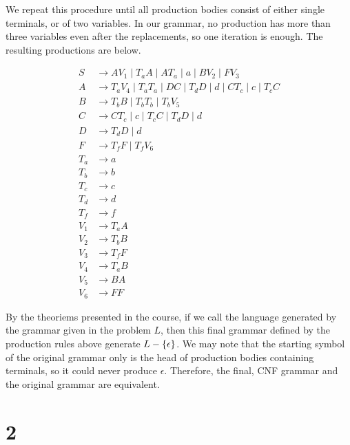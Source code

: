 \documentclass{article}
\begin{document}
\begin{enumerate}[(a)]
        We repeat this procedure until all production bodies consist of either single terminals, or of two variables. In our grammar, no production has more than three variables even after the replacements, so one iteration is enough. The resulting productions are below.

        \begin{align*}
            S &\to AV_1 \mid T_aA \mid AT_a \mid a \mid BV_2 \mid FV_3 \\
            A &\to T_aV_4 \mid T_aT_a \mid DC \mid T_dD \mid d \mid CT_c \mid c \mid T_cC \\
            B &\to T_bB \mid T_bT_b \mid T_bV_5 \\
            C &\to CT_c \mid c \mid T_cC \mid T_dD \mid d \\
            D &\to T_dD \mid d \\
            F &\to T_fF \mid T_fV_6 \\
            T_a &\to a \\
            T_b &\to b \\
            T_c &\to c \\
            T_d &\to d \\
            T_f &\to f \\
            V_1 &\to T_aA \\
            V_2 &\to T_bB \\
            V_3 &\to T_fF \\
            V_4 &\to T_aB \\
            V_5 &\to BA \\
            V_6 &\to FF
        \end{align*}

        By the theoriems presented in the course, if we call the language generated by the grammar given in the problem $L$, then this final grammar defined by the production rules above generate $L - \set{\epsilon}$. We may note that the starting symbol of the original grammar only is the head of production bodies containing terminals, so it could never produce $\epsilon$. Therefore, the final, CNF grammar and the original grammar are equivalent.

\end{enumerate}

\newpage
\section*{2}
\end{document}
